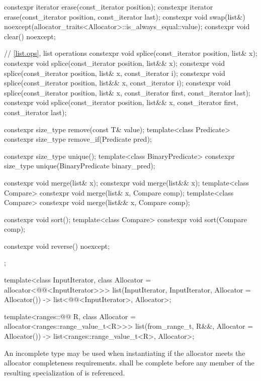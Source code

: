 \begin{codeblock}
{{    constexpr iterator erase(const_iterator position);
    constexpr iterator erase(const_iterator position, const_iterator last);
    constexpr void     swap(list&) noexcept(allocator_traits<Allocator>::is_always_equal::value);
    constexpr void     clear() noexcept;

    // \ref{list.ops}, list operations
    constexpr void splice(const_iterator position, list& x);
    constexpr void splice(const_iterator position, list&& x);
    constexpr void splice(const_iterator position, list& x, const_iterator i);
    constexpr void splice(const_iterator position, list&& x, const_iterator i);
    constexpr void splice(const_iterator position, list& x,
                          const_iterator first, const_iterator last);
    constexpr void splice(const_iterator position, list&& x,
                          const_iterator first, const_iterator last);

    constexpr size_type remove(const T& value);
    template<class Predicate> constexpr size_type remove_if(Predicate pred);

    constexpr size_type unique();
    template<class BinaryPredicate>
      constexpr size_type unique(BinaryPredicate binary_pred);

    constexpr void merge(list& x);
    constexpr void merge(list&& x);
    template<class Compare> constexpr void merge(list& x, Compare comp);
    template<class Compare> constexpr void merge(list&& x, Compare comp);

    constexpr void sort();
    template<class Compare> constexpr void sort(Compare comp);

    constexpr void reverse() noexcept;
  };

  template<class InputIterator, class Allocator = allocator<@@<InputIterator>>>
    list(InputIterator, InputIterator, Allocator = Allocator())
      -> list<@@<InputIterator>, Allocator>;

  template<ranges::@@ R, class Allocator = allocator<ranges::range_value_t<R>>>
    list(from_range_t, R&&, Allocator = Allocator())
      -> list<ranges::range_value_t<R>, Allocator>;
}
\end{codeblock}

\pnum
An incomplete type  may be used when instantiating 
if the allocator meets the
allocator completeness requirements.
 shall be complete before any member of the resulting specialization
of  is referenced.

